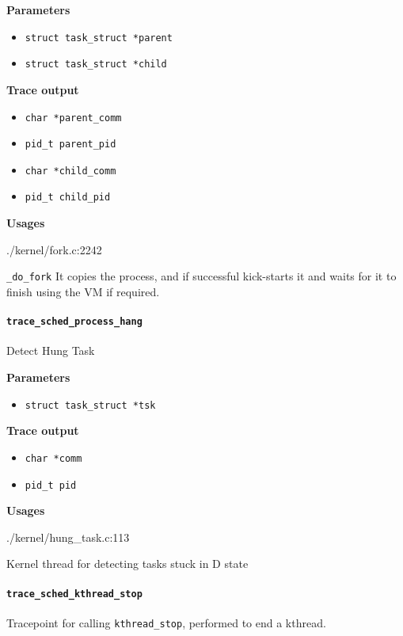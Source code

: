 \textbf{Parameters}
\begin{itemize}
    \item \verb|struct task_struct *parent|
    \item \verb|struct task_struct *child|
\end{itemize}

\textbf{Trace output}
\begin{itemize}
    \item \verb|char *parent_comm|
    \item \verb|pid_t parent_pid|
    \item \verb|char *child_comm|
    \item \verb|pid_t child_pid|
\end{itemize}

\textbf{Usages}
\begin{code}
./kernel/fork.c:2242
\end{code}
\verb|_do_fork|
    It copies the process, and if successful kick-starts                                                                                                   
    it and waits for it to finish using the VM if required.
    
\paragraph{\texttt{trace\_sched\_process\_hang}}
Detect Hung Task

\textbf{Parameters}
\begin{itemize}
    \item \verb|struct task_struct *tsk|
\end{itemize}

\textbf{Trace output}
\begin{itemize}
    \item \verb|char *comm|
    \item \verb|pid_t pid|
\end{itemize}

\textbf{Usages}
\begin{code}
./kernel/hung_task.c:113
\end{code}
Kernel thread for detecting tasks stuck in D state
  
\paragraph{\texttt{trace\_sched\_kthread\_stop}}
Tracepoint for calling \verb|kthread_stop|, performed to end a kthread.

